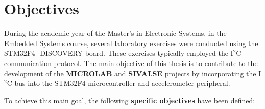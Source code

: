 \section{Objectives} 
\label{chap:Objectives}

During the academic year of the Master's in Electronic Systems, in the Embedded 
Systems course, several laboratory exercises were conducted using the STM32F4-
DISCOVERY board. These exercises typically employed the I$^2$C communication 
protocol. The main objective of this thesis is to contribute to the development of 
the \textbf{MICROLAB} and \textbf{SIVALSE} projects by incorporating the I$^2$C bus into 
the STM32F4 microcontroller and accelerometer peripheral.

To achieve this main goal, the following \textbf{specific objectives} have been defined:

